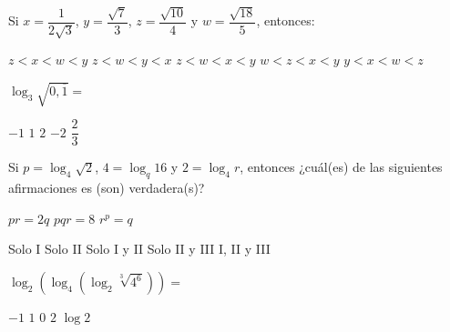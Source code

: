 \documentclass[revolver]{srs}
\begin{document}
\begin{preguntas}[after-item-skip=2cm]
\pregunta Si $x = \dfrac{1}{2\sqrt{3}}$, $y = \dfrac{\sqrt{7}}{3}$, $z = \dfrac{\sqrt{10}}{4}$ y $w = \dfrac{\sqrt{18}}{5}$, entonces:
\begin{vertical}
\alternativa $z < x < w < y$
\alternativa $z < w < y < x$
\alternativa $z < w < x < y$
\alternativa $w < z < x < y$
\alternativa $y < x < w < z$
\end{vertical}

\pregunta $\log_{3} \sqrt{0,\overline{1}} =$
\begin{vertical}
\alternativa $-1$
\alternativa $1$
\alternativa $2$
\alternativa $-2$
\alternativa $\dfrac{2}{3}$
\end{vertical}

\pregunta Si $p = \log_4 \sqrt{2}$, $4 = \log_q 16$ y $2 = \log_4 r$, entonces ¿cuál(es) de las siguientes afirmaciones es (son) verdadera(s)?
\begin{verticali}
\alternativa $pr = 2q$
\alternativa $pqr = 8$
\alternativa $r^p = q$
\end{verticali}
\begin{vertical}
\alternativa Solo I
\alternativa Solo II
\alternativa Solo I y II
\alternativa Solo II y III
\alternativa I, II y III
\end{vertical}

\pregunta $\log_2\left(\log_4 \left(\log_2 \sqrt[3]{4^6}\right)\right) =$
\begin{vertical}
\alternativa $-1$
\alternativa $1$
\alternativa $0$
\alternativa $2$
\alternativa $\log 2$
\end{vertical}


\end{preguntas}
\end{document}
